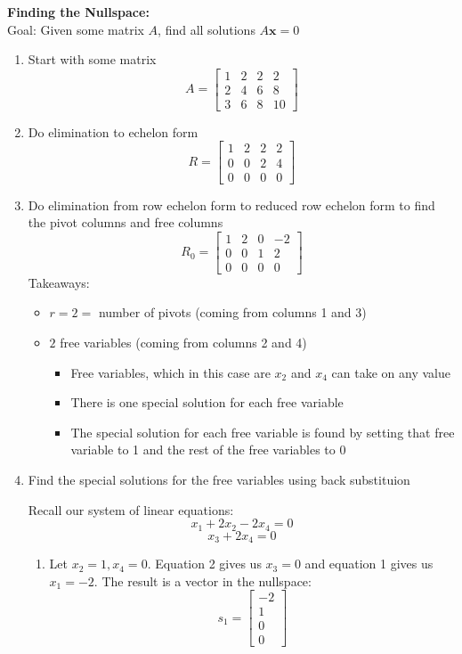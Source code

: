 \documentclass[11pt]{article}
\begin{document}
\textbf{Finding the Nullspace:} \\
Goal: Given some matrix $A$, find all solutions $A\boldsymbol{x} = 0$
\begin{enumerate}
    \item Start with some matrix \[ A = 
    \begin{bmatrix}
        1 & 2 & 2 & 2 \\
        2 & 4 & 6 & 8 \\
        3 & 6 & 8 & 10
    \end{bmatrix}
\]
    \item Do elimination to echelon form \[ R = 
    \begin{bmatrix}
        1 & 2 & 2 & 2 \\
        0 & 0 & 2 & 4 \\
        0 & 0 & 0 & 0
    \end{bmatrix}
\]
    \item Do elimination from row echelon form to reduced row echelon form to find the pivot 
    columns and free columns \[ R_0 = 
    \begin{bmatrix}
        1 & 2 & 0 & -2 \\
        0 & 0 & 1 & 2 \\
        0 & 0 & 0 & 0
    \end{bmatrix}
\]
    Takeaways:
    \begin{itemize}
        \item $r = 2 = $ number of pivots (coming from columns 1 and 3)
        \item $2$ free variables (coming from columns 2 and 4)
        \begin{itemize}
            \item Free variables, which in this case are $x_2$ and $x_4$ can take on any value
            \item There is one special solution for each free variable
            \item The special solution for each free variable is found by setting that free 
            variable to 1 and the rest of the free variables to 0
        \end{itemize}
    \end{itemize}

    \item Find the special solutions for the free variables using back substituion
    
    Recall our system of linear equations: \\
    \[x_1 + 2x_2 - 2x_4 = 0 \]
    \[ x_3 + 2x_4 = 0 \]
    \begin{enumerate}
        \item Let $x_2 = 1, x_4 = 0$. Equation 2 gives us $x_3 = 0$ and equation 1 gives us 
        $x_1 = -2$. The result is a vector in the nullspace: \[ s_1 = \begin{bmatrix}
            -2 \\
            1 \\
            0 \\
            0
        \end{bmatrix}
    \]


\end{enumerate}
\end{enumerate}
\end{document}
